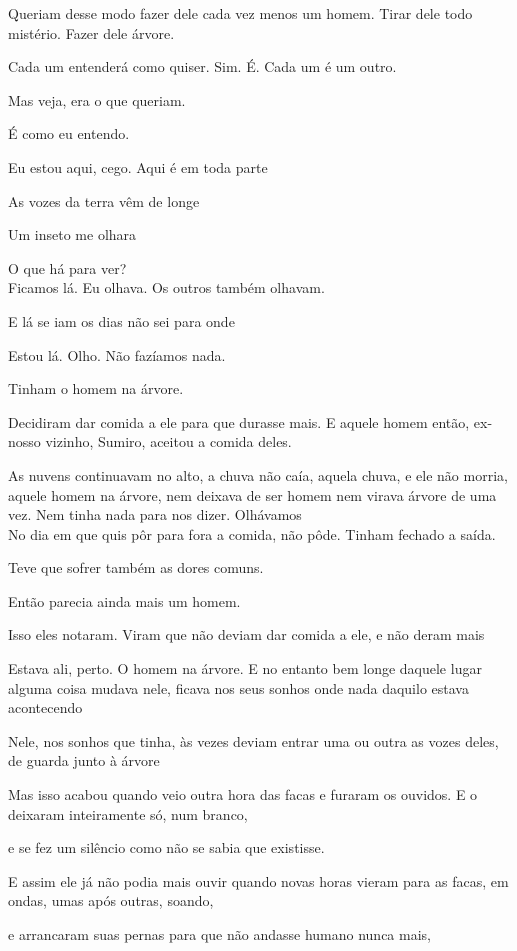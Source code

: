 Queriam desse modo fazer dele cada vez menos um homem. Tirar dele todo
mistério. Fazer dele árvore.

Cada um entenderá como quiser. Sim. É. Cada um é um outro.

Mas veja, era o que queriam.

É como eu entendo.

Eu estou aqui, cego. Aqui é em toda parte

As vozes da terra vêm de longe

Um inseto me olhara

O que há para ver?\\

Ficamos lá. Eu olhava. Os outros também olhavam.

E lá se iam os dias não sei para onde

Estou lá. Olho. Não fazíamos nada.

Tinham o homem na árvore.

Decidiram dar comida a ele para que durasse mais. E aquele homem então,
ex-nosso vizinho, Sumiro, aceitou a comida deles.

As nuvens continuavam no alto, a chuva não caía, aquela chuva, e ele não
morria, aquele homem na árvore, nem deixava de ser homem nem virava
árvore de uma vez. Nem tinha nada para nos dizer. Olhávamos\\

No dia em que quis pôr para fora a comida, não pôde. Tinham fechado a
saída.

Teve que sofrer também as dores comuns.

Então parecia ainda mais um homem.

Isso eles notaram. Viram que não deviam dar comida a ele, e não deram
mais

Estava ali, perto. O homem na árvore. E no entanto bem longe daquele
lugar alguma coisa mudava nele, ficava nos seus sonhos onde nada daquilo
estava acontecendo

Nele, nos sonhos que tinha, às vezes deviam entrar uma ou outra as vozes
deles, de guarda junto à árvore

Mas isso acabou quando veio outra hora das facas e furaram os ouvidos. E
o deixaram inteiramente só, num branco,

e se fez um silêncio como não se sabia que existisse.

E assim ele já não podia mais ouvir quando novas horas vieram para as
facas, em ondas, umas após outras, soando,

e arrancaram suas pernas para que não andasse humano nunca mais,

